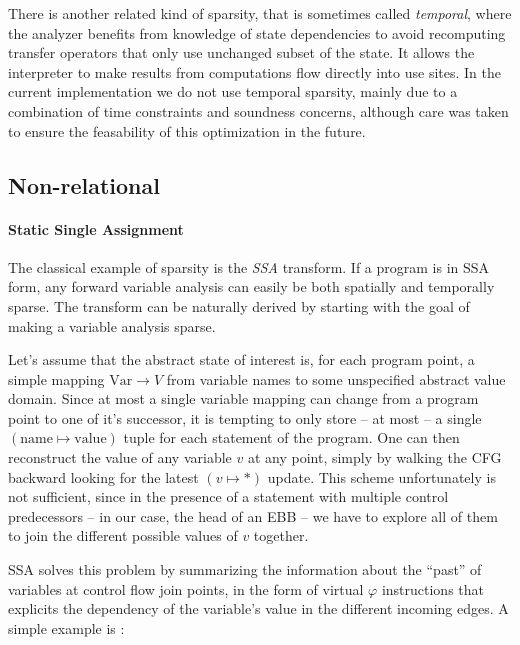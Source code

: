 \documentclass[11pt]{article}
\renewcommand{\phi}{\varphi}
\begin{document}
There is another related kind of sparsity, that is sometimes called \emph{temporal}, where the analyzer benefits from knowledge of state dependencies to avoid recomputing transfer operators that only use unchanged subset of the state. It allows the interpreter to make results from computations flow directly into use sites. In the current implementation we do not use temporal sparsity, mainly due to a combination of time constraints and soundness concerns, although care was taken to ensure the feasability of this optimization in the future.

\subsection*{Non-relational}

\paragraph{Static Single Assignment} The classical example of sparsity is the \emph{SSA} transform. If a program is in SSA form, any forward variable analysis can easily be both spatially and temporally sparse. The transform can be naturally derived by starting with the goal of making a variable analysis sparse.

Let's assume that the abstract state of interest is, for each program point, a simple mapping $\text{Var}\to V$ from variable names to some unspecified abstract value domain. Since at most a single variable mapping can change from a program point to one of it's successor, it is tempting to only store -- at most -- a single $(\text{name}\mapsto\text{value})$ tuple for each statement of the program. One can then reconstruct the value of any variable $v$ at any point, simply by walking the CFG backward looking for the latest $(v\mapsto *)$ update. This scheme unfortunately is not sufficient, since in the presence of a statement with multiple control predecessors -- in our case, the head of an EBB -- we have to explore all of them to join the different possible values of $v$ together.

SSA solves this problem by summarizing the information about the ``past'' of variables at control flow join points, in the form of virtual $\phi$ instructions that explicits the dependency of the variable's value in the different incoming edges. A simple example is :
\end{document}
